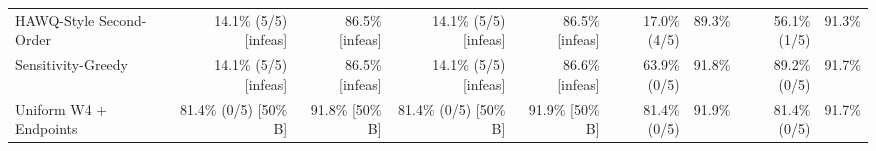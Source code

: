 \begin{table}[!t]
\begin{tabular}{lrrrrrrrr}
\quad HAWQ-Style Second-Order & 14.1\% (5/5) [infeas] & 86.5\% [infeas] & 14.1\% (5/5) [infeas] & 86.5\% [infeas] & 17.0\% (4/5) & 89.3\% & 56.1\% (1/5) & 91.3\% \\
\quad Sensitivity-Greedy & 14.1\% (5/5) [infeas] & 86.5\% [infeas] & 14.1\% (5/5) [infeas] & 86.6\% [infeas] & 63.9\% (0/5) & 91.8\% & 89.2\% (0/5) & 91.7\% \\
\quad Uniform W4 + Endpoints & 81.4\% (0/5) [50\% B] & 91.8\% [50\% B] & 81.4\% (0/5) [50\% B] & 91.9\% [50\% B] & 81.4\% (0/5) & 91.9\% & 81.4\% (0/5) & 91.7\% \\
\bottomrule
\end{tabular}
\end{table}
